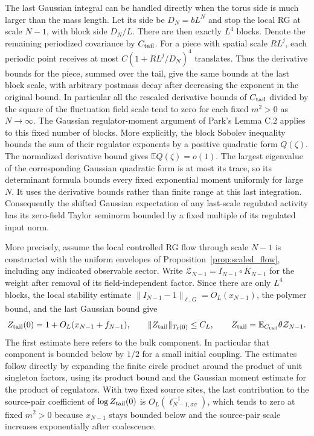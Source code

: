 \documentclass[11pt]{article}
\begin{document}
The last Gaussian integral can be handled directly when the
torus side is much larger than the mass length. Let its side be
\(D_N=bL^N\) and stop the local RG at scale \(N-1\), with block side
\(D_N/L\). There are then exactly \(L^4\) blocks. Denote the remaining
periodized covariance by \(C_{\rm tail}\). For a piece with spatial
scale \(RL^j\), each periodic point receives at most
\(C(1+RL^j/D_N)^4\) translates. Thus the derivative bounds for the
piece, summed over the tail, give the same bounds at the last block
scale, with arbitrary postmass decay after decreasing the exponent
in the original bound. In particular all the rescaled derivative
bounds of \(C_{\rm tail}\) divided by the square of the fluctuation
field scale tend to zero for each fixed \(m^2>0\) as \(N\to\infty\).
The Gaussian regulator-moment argument of Park's Lemma C.2
applies to this fixed number of blocks. More explicitly, the block
Sobolev inequality bounds the sum of their regulator exponents by
a positive quadratic form \(Q(\zeta)\). The normalized derivative
bound gives \(\mathbb E Q(\zeta)=o(1)\). The largest eigenvalue
of the corresponding Gaussian quadratic form is at most its trace,
so its determinant formula bounds every fixed exponential moment
uniformly for large \(N\). It uses the derivative
bounds rather than finite range at this last integration.
Consequently the shifted Gaussian expectation of any last-scale
regulated activity has its zero-field Taylor seminorm bounded
by a fixed multiple of its regulated input norm.

More precisely, assume the local controlled RG flow through scale
\(N-1\) is constructed with the uniform envelopes of
Proposition~\ref{prop:scaled_flow}, including any indicated
observable sector. Write \(\mathcal Z_{N-1}=I_{N-1}\circ K_{N-1}\)
for the weight after removal of its field-independent factor.
Since there are only \(L^4\) blocks, the local stability estimate
\(\|I_{N-1}-1\|_{\ell,G}=O_L(x_{N-1})\), the polymer bound,
and the last Gaussian bound give
\[
 Z_{\rm tail}(0)=1+O_L(x_{N-1}+f_{N-1}),\qquad
 \|Z_{\rm tail}\|_{T_\ell(0)}\le C_L,
 \qquad Z_{\rm tail}=\mathbb E_{C_{\rm tail}}\theta\mathcal Z_{N-1}.
\]
The first estimate here refers to the bulk component. In particular
that component is bounded below by \(1/2\) for a small initial
coupling. The estimates follow directly by expanding the finite
circle product around the product of unit singleton factors,
using its product bound and the Gaussian moment estimate for
the product of regulators. With two fixed source sites, the
last contribution to the source-pair coefficient of
\(\log Z_{\rm tail}(0)\) is \(O_L(\ell_{N-1,\sigma\sigma}^{-1})\),
which tends to zero at fixed \(m^2>0\) because \(x_{N-1}\) stays
bounded below and the source-pair scale increases exponentially
after coalescence.
\end{document}
